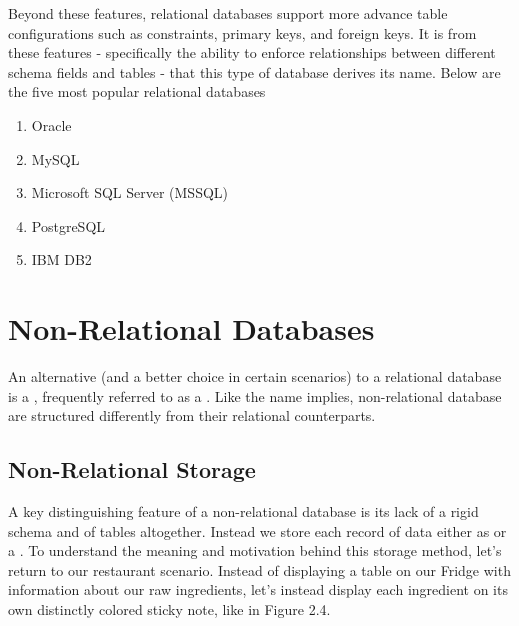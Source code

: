 Beyond these features, relational databases support more advance table configurations such as constraints, primary keys, and foreign keys. It is from these features - specifically the ability to enforce relationships between different schema fields and tables - that this type of database derives its name. Below are the five most popular relational databases

\begin{enumerate}
    \item Oracle
    \item MySQL
    \item Microsoft SQL Server (MSSQL)
    \item PostgreSQL
    \item IBM DB2
\end{enumerate}

\section{Non-Relational Databases}

An alternative (and a better choice in certain scenarios) to a relational database is a , frequently referred to as a . Like the name implies, non-relational database are structured differently from their relational counterparts. 

\subsection{Non-Relational Storage}

A key distinguishing feature of a non-relational database is its lack of a rigid schema and of tables altogether. Instead we store each record of data either as  or a . To understand the meaning and motivation behind this storage method, let's return to our restaurant scenario. Instead of displaying a table on our Fridge with information about our raw ingredients, let's instead display each ingredient on its own distinctly colored sticky note, like in Figure 2.4.


